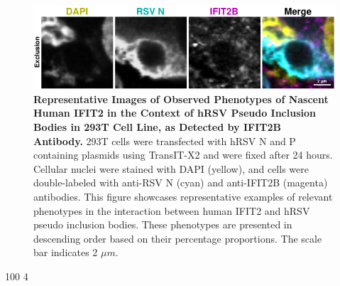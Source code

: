\begin{figure}
    \centering
    \includegraphics[width=1\linewidth]{09. Chapter 4/Figs/02. pIB/03. IFIT2B/03. i2b-293t-hnhp.pdf} 
    \caption[Representative Images of Observed Phenotypes of Nascent Human IFIT2 in the Context of hRSV Pseudo Inclusion Bodies in 293T Cell Line, as Detected by IFIT2B Antibody.]{\textbf{Representative Images of Observed Phenotypes of Nascent Human IFIT2 in the Context of hRSV Pseudo Inclusion Bodies in 293T Cell Line, as Detected by IFIT2B Antibody.} 293T cells were transfected with hRSV N and P containing plasmids using TransIT-X2 and were fixed after 24 hours. Cellular nuclei were stained with DAPI (yellow), and cells were double-labeled with anti-RSV N (cyan) and anti-IFIT2B (magenta) antibodies. This figure showcases representative examples of relevant phenotypes in the interaction between human IFIT2 and hRSV pseudo inclusion bodies. These phenotypes are presented in descending order based on their percentage proportions. The scale bar indicates 2 \(\mu m\).}
    \label{fig:Representative Images of Observed Phenotypes of Nascent Human IFIT2 in the Context of hRSV Pseudo Inclusion Bodies in 293T Cell Line, as Detected by IFIT2B Antibody}
\end{figure}

100
4

